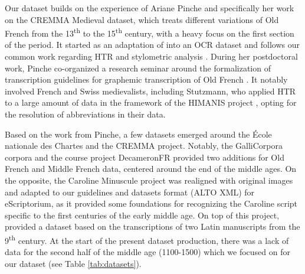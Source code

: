 \documentclass{article}
\begin{document}
Our dataset builds on the experience of Ariane Pinche and specifically her work on the CREMMA Medieval dataset, which treats different variations of Old French from the 13\textsuperscript{th} to the 15\textsuperscript{th} century, with a heavy focus on the first section of the period. It started as an adaptation of \cite{pinche_edition_nodate} into an OCR dataset and follows our common work regarding HTR and stylometric analysis \citep{10.1093/llc/fqab033}. During her postdoctoral work, Pinche co-organized a research seminar around the formalization of transcription guidelines for graphemic transcription of Old French \citep{pinche:hal-03697382}. It notably involved French and Swiss medievalists, including Stutzmann, who applied HTR to a large amount of data in the framework of the HIMANIS project \citep{bluche2017preparatory}, opting for the resolution of abbreviations in their data.


Based on the work from Pinche, a few datasets emerged around the École nationale des Chartes and the CREMMA project. Notably, the GalliCorpora corpora \citep{gallicorpora15} and the course project DecameronFR \citep{DecameronFR} provided two additions for Old French and Middle French data, centered around the end of the middle ages. On the opposite, the Caroline Minuscule project \citep{hawk2018modelling} was realigned with original images and adapted to our guidelines and datasets format (ALTO XML) for eScriptorium, as it provided some foundations for recognizing the Caroline script specific to the first centuries of the early middle age. On top of this project, \cite{vlachou-efstathiou2022voss} provided a dataset based on the transcriptions of two Latin manuscripts from the 9\textsuperscript{th} century. At the start of the present dataset production, there was a lack of data for the second half of the middle age (1100-1500) which we focused on for our dataset (see Table \ref{tab:datasets}).
\end{document}
